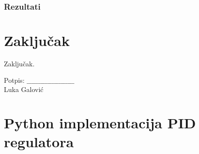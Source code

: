 \documentclass[times, utf8, diplomski]{fer}
\begin{document}
\subsection{Rezultati}
 


\chapter{Zaključak}
Zaključak.

\vfill
\hspace*{0pt}\hfill Potpis:  $\_\_\_\_\_\_\_\_\_\_\_\_\_\_\_\_\_\_\_\_\_$\\
\hspace*{5pt}\hfill Luka Galović




\appendix
\chapter{Python implementacija PID regulatora}

\end{document}
